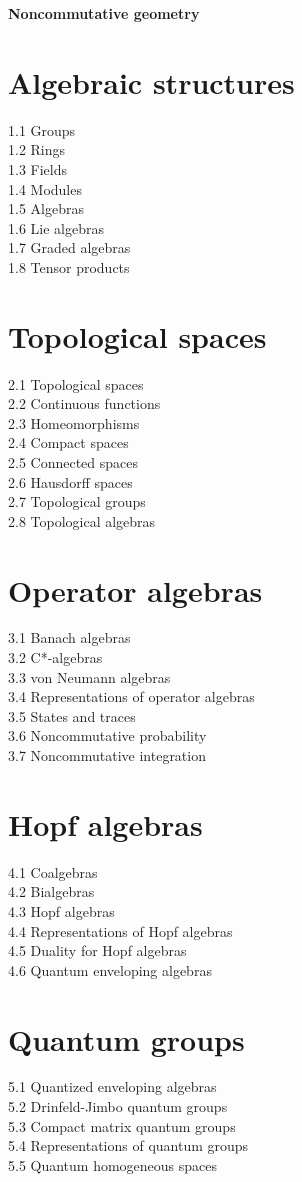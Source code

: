 ﻿{\Large \bf{Noncommutative geometry}}

\section{Algebraic structures}
1.1 Groups\\
1.2 Rings\\
1.3 Fields\\
1.4 Modules\\
1.5 Algebras\\
1.6 Lie algebras\\
1.7 Graded algebras\\
1.8 Tensor products
\section{Topological spaces}
2.1 Topological spaces\\
2.2 Continuous functions\\
2.3 Homeomorphisms\\
2.4 Compact spaces\\
2.5 Connected spaces\\
2.6 Hausdorff spaces\\
2.7 Topological groups\\
2.8 Topological algebras
\section{Operator algebras}
3.1 Banach algebras\\
3.2 C*-algebras\\
3.3 von Neumann algebras\\
3.4 Representations of operator algebras\\
3.5 States and traces\\
3.6 Noncommutative probability\\
3.7 Noncommutative integration
\section{Hopf algebras}
4.1 Coalgebras\\
4.2 Bialgebras\\
4.3 Hopf algebras\\
4.4 Representations of Hopf algebras\\
4.5 Duality for Hopf algebras\\
4.6 Quantum enveloping algebras
\section{Quantum groups}
5.1 Quantized enveloping algebras\\
5.2 Drinfeld-Jimbo quantum groups\\
5.3 Compact matrix quantum groups\\
5.4 Representations of quantum groups\\
5.5 Quantum homogeneous spaces

